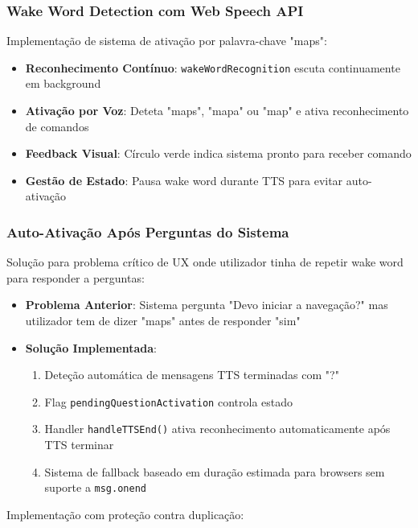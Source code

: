 \documentclass{report}
\begin{document}
\subsubsection{Wake Word Detection com Web Speech API}

Implementação de sistema de ativação por palavra-chave "maps":

\begin{itemize}
    \item \textbf{Reconhecimento Contínuo}: \texttt{wakeWordRecognition} escuta continuamente em background
    \item \textbf{Ativação por Voz}: Deteta "maps", "mapa" ou "map" e ativa reconhecimento de comandos
    \item \textbf{Feedback Visual}: Círculo verde indica sistema pronto para receber comando
    \item \textbf{Gestão de Estado}: Pausa wake word durante TTS para evitar auto-ativação
\end{itemize}

\subsubsection{Auto-Ativação Após Perguntas do Sistema}

Solução para problema crítico de UX onde utilizador tinha de repetir wake word para responder a perguntas:

\begin{itemize}
    \item \textbf{Problema Anterior}: Sistema pergunta "Devo iniciar a navegação?" mas utilizador tem de dizer "maps" antes de responder "sim"
    
    \item \textbf{Solução Implementada}:
    \begin{enumerate}
        \item Deteção automática de mensagens TTS terminadas com "?"
        \item Flag \texttt{pendingQuestionActivation} controla estado
        \item Handler \texttt{handleTTSEnd()} ativa reconhecimento automaticamente após TTS terminar
        \item Sistema de fallback baseado em duração estimada para browsers sem suporte a \texttt{msg.onend}
    \end{enumerate}
\end{itemize}

Implementação com proteção contra duplicação:
\end{document}
